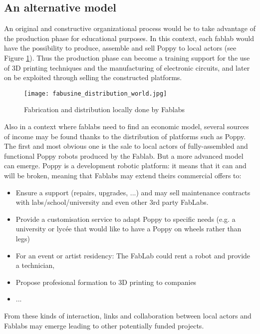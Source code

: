 \subsection{An alternative model } %

An original and constructive organizational process would be to take advantage of the production phase for educational purposes. In this context, each fablab would have the possibility to produce, assemble and sell Poppy to local actors (see Figure \ref{fig:word_fab}). Thus the production phase can become a training support for the use of 3D printing techniques and the manufacturing of electronic circuits, and later on be exploited through selling the constructed platforms.


\begin{figure}[tb]
    \begin{center}
        \texttt{[image: fabusine\_distribution\_world.jpg]}
    \end{center}
    \caption{Fabrication and distribution locally done by Fablabs}
    \label{fig:word_fab}
\end{figure}


Also in a context where fablabs need to find an economic model, several sources of income may be found thanks to the distribution of platforms such as Poppy. The first and most obvious one is the sale to local actors of fully-assembled and functional Poppy robots produced by the Fablab. But a more advanced model can emerge. Poppy is a development robotic platform: it means that it can and will be broken, meaning that Fablabs may extend theirs commercial offers to:

\begin{itemize}
    \item Ensure a support (repairs, upgrades, ...) and may sell maintenance contracts with labs/school/university and even other 3rd party FabLabs.
    \item Provide a customisation service to adapt Poppy to specific needs (e.g. a university or lycée that would like to have a Poppy on wheels rather than legs)
    \item For an event or artist residency: The FabLab could rent a robot and provide a technician,
    \item Propose profesional formation to 3D printing to companies
    \item ...
\end{itemize}

From these kinds of interaction, links and collaboration between local actors and Fablabs may emerge leading to other potentially funded projects.

